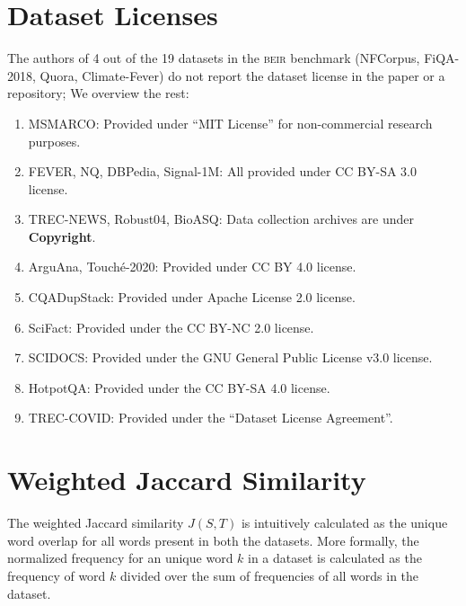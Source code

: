 \documentclass{article}
\newcommand{\custo}[1]{\textsc{\normalsize #1}}
\newcommand{\beir}{\custo{beir}\xspace}
\begin{document}
\vspace{-2mm}
\section{Dataset Licenses}\label{sec:dataset_licenses}
\vspace{-2mm}

The authors of 4 out of the 19 datasets in the \beir benchmark (NFCorpus, FiQA-2018, Quora, Climate-Fever) do not report the dataset license in the paper or a repository; We overview the rest:

\begin{enumerate}
    \item[$\bullet$] MSMARCO: Provided under ``MIT License'' for non-commercial research purposes.
    \item[$\bullet$] FEVER, NQ, DBPedia, Signal-1M: All provided under CC BY-SA 3.0 license.
    \item[$\bullet$] TREC-NEWS, Robust04, BioASQ: Data collection archives are under \textbf{Copyright}.
    \item[$\bullet$] ArguAna, Touch\'e-2020: Provided under CC BY 4.0 license.
    \item[$\bullet$] CQADupStack: Provided under Apache License 2.0 license.
    \item[$\bullet$] SciFact: Provided under the CC BY-NC 2.0 license.
    \item[$\bullet$] SCIDOCS: Provided under the GNU General Public License v3.0 license.
    \item[$\bullet$] HotpotQA: Provided under the CC BY-SA 4.0 license.
    \item[$\bullet$] TREC-COVID: Provided under the ``Dataset License Agreement''.
    
\end{enumerate}


\section{Weighted Jaccard Similarity}\label{sec:weighted_jaccard_similarity}
\vspace{-2mm}

The weighted Jaccard similarity $J(S,T)$ \cite{ioffe2010improved} is intuitively calculated as the unique word overlap for all words present in both the datasets. More formally, the normalized frequency for an unique word $k$ in a dataset is calculated as the frequency of word $k$ divided over the sum of frequencies of all words in the dataset. 
\end{document}
